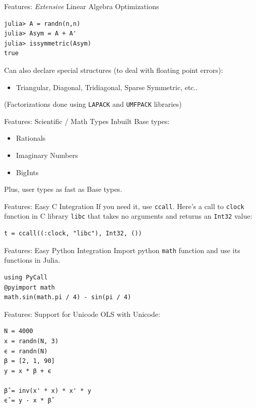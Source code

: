 \documentclass[11pt]{beamer}
\begin{document}
\begin{frame}[fragile]{Features: \emph{Extensive} Linear Algebra Optimizations}
\begin{verbatim}
julia> A = randn(n,n)
julia> Asym = A + A'
julia> issymmetric(Asym)
true
\end{verbatim}
\pause
Can also declare special structures (to deal with floating point errors):
\begin{itemize}
    \item Triangular, Diagonal, Tridiagonal, Sparse Symmetric, etc..
\end{itemize}
\pause (Factorizations done using \texttt{LAPACK} and \texttt{UMFPACK} libraries)
\end{frame}

\begin{frame}[fragile]{Features: Scientific / Math Types Inbuilt}
Base types:
\begin{itemize}
    \item Rationals
    \item Imaginary Numbers
    \item BigInts
\end{itemize}
\pause
Plus, user types as fast as Base types.
\end{frame}

\begin{frame}[fragile]{Features: Easy C Integration}
If you need it, use \texttt{ccall}.
\pause
Here's a call to \texttt{clock} function in C library \texttt{libc} that takes no arguments and returns an \texttt{Int32} value:
\begin{verbatim}
t = ccall((:clock, "libc"), Int32, ())
\end{verbatim}
\end{frame}

\begin{frame}[fragile]{Features: Easy Python Integration}
Import python \texttt{math} function and use its functions in Julia.
\begin{verbatim}
using PyCall
@pyimport math
math.sin(math.pi / 4) - sin(pi / 4)
\end{verbatim}
\end{frame}

\begin{frame}[fragile]{Features: Support for Unicode}
OLS with Unicode:
\begin{verbatim}
N = 4000
x = randn(N, 3)
ϵ = randn(N)
β = [2, 1, 90]
y = x * β + ϵ

β̂ = inv(x' * x) * x' * y
ϵ̂ = y - x * β̂
\end{verbatim}
\end{frame}
\end{document}

